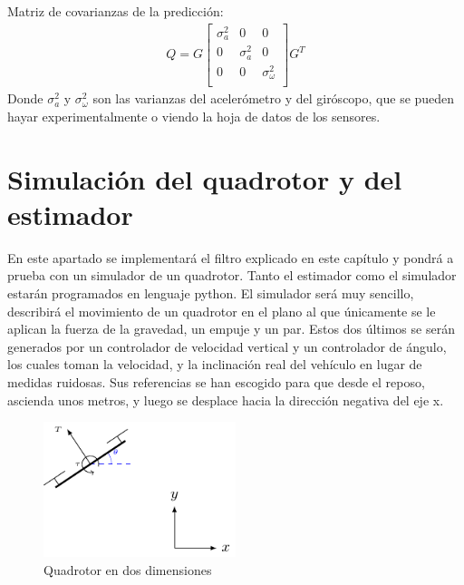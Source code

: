 Matriz de covarianzas de la predicción:
\begin{align}
Q = 
G
\begin{bmatrix} 
\sigma^2_a 	& 0 		& 0\\
0 		& \sigma^2_a 	& 0\\
0 		& 0 		& \sigma^2_\omega\\
\end{bmatrix}
G^T
\end{align}
Donde $\sigma^2_a$ y $\sigma^2_\omega$ son las varianzas del acelerómetro y del giróscopo, que se pueden hayar experimentalmente o viendo la hoja de datos de los sensores. 

\section{Simulación del quadrotor y del estimador}
En este apartado se implementará el filtro explicado en este capítulo y pondrá a prueba con un simulador de un quadrotor. Tanto el estimador como el simulador estarán programados en lenguaje python. El simulador será muy sencillo, describirá el movimiento de un quadrotor en el plano al que únicamente se le aplican la fuerza de la gravedad, un empuje y un par. Estos dos últimos se serán generados por un controlador de velocidad vertical y un controlador de ángulo, los cuales toman la velocidad, y la inclinación real del vehículo en lugar de medidas ruidosas. Sus referencias se han escogido para que desde el reposo, ascienda unos metros, y luego se desplace hacia la dirección negativa del eje x. 


\begin{figure}
\includegraphics[width=0.5\textwidth]{estimador_px4/tikz/quadrotor_2d}
\caption{Quadrotor en dos dimensiones}
\label{fig:model}
\end{figure}

